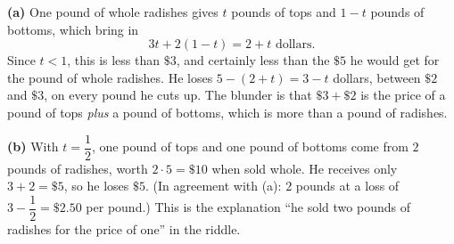 \textbf{(a)} One pound of whole radishes gives $t$ pounds of tops and $1-t$ pounds of bottoms, which bring in
\[3t+2(1-t)=2+t \text{ dollars}.\]
Since $t<1$, this is less than $\$3$, and certainly less than the $\$5$ he would get for the pound of whole radishes. He loses $5-(2+t)=3-t$ dollars, between $\$2$ and $\$3$, on every pound he cuts up. The blunder is that $\$3+\$2$ is the price of a pound of tops \emph{plus} a pound of bottoms, which is more than a pound of radishes.

\textbf{(b)} With $t=\dfrac{1}{2}$, one pound of tops and one pound of bottoms come from $2$ pounds of radishes, worth $2\cdot5=\$10$ when sold whole. He receives only $3+2=\$5$, so he loses $\boxed{\$5}$. (In agreement with (a): $2$ pounds at a loss of $3-\dfrac{1}{2}=\$2.50$ per pound.) This is the explanation ``he sold two pounds of radishes for the price of one'' in the riddle.
